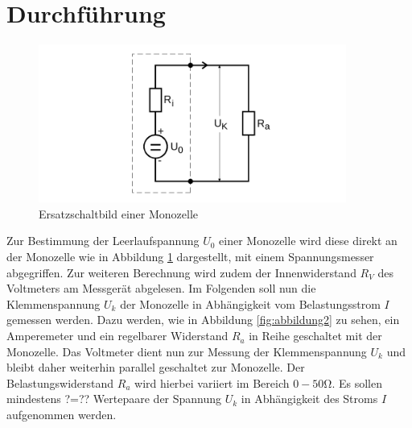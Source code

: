 
\section{Durchführung}
\label{sec:Durchführung}
\begin{figure}[H]
  \centering
  \includegraphics[width=0.9\textwidth]{Bilder/Abbildung1.png}
  \caption{Ersatzschaltbild einer Monozelle \cite{Anleitung}}
  \label{fig:abbildung1}
\end{figure}
Zur Bestimmung der Leerlaufspannung $U_0$ einer Monozelle wird diese direkt an der Monozelle wie in Abbildung \ref{fig:abbildung1} dargestellt, mit einem Spannungsmesser abgegriffen.
Zur weiteren Berechnung wird zudem der Innenwiderstand $R_V$ des Voltmeters am Messgerät abgelesen.
Im Folgenden soll nun die Klemmenspannung $U_k$ der Monozelle in Abhängigkeit vom Belastungsstrom $I$ gemessen werden.
Dazu werden, wie in Abbildung \ref{fig:abbildung2} zu sehen, ein Amperemeter und ein regelbarer Widerstand $R_a$ in Reihe geschaltet mit der Monozelle. Das Voltmeter dient nun zur Messung der Klemmenspannung $U_k$ und bleibt daher weiterhin parallel geschaltet zur Monozelle.
Der Belastungswiderstand $R_a$ wird hierbei variiert im Bereich $0-50\si{\ohm}$.
Es sollen mindestens ?=?? Wertepaare der Spannung $U_k$ in Abhängigkeit des Stroms $I$ aufgenommen werden.




